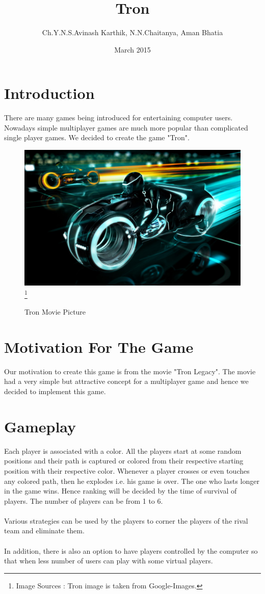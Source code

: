 \documentclass[14 pt]{article}
\title{\TitleFont Tron}
\author{Ch.Y.N.S.Avinash Karthik, N.N.Chaitanya, Aman Bhatia}
\date{March 2015}
\begin{document}
\maketitle

\section{Introduction}
There are many games being introduced for entertaining computer users. Nowadays simple multiplayer games are much more popular than complicated single player games. We decided to create the game "Tron".\\

\begin{figure}[h!]
\centering
\includegraphics[width =100 mm]{2.jpg}
\footnote{Image Sources : Tron image is taken from Google-Images.}\\
\caption{Tron Movie Picture}
\end{figure}

\section{Motivation For The Game}
    Our motivation to create this game is from the movie "Tron Legacy". The movie had a very simple but attractive concept for a multiplayer game and hence we decided to implement this game.\\

\section{Gameplay}
    Each player is associated with a color. All the players start at some random positions and their path is captured or colored from their respective starting position with their respective color. Whenever a player crosses or even touches any colored path, then he explodes i.e. his game is over. The one who lasts longer in the game wins. Hence ranking will be decided by the time of survival of players. The number of players can be from 1 to 6.\\\\
    Various strategies can be used by the players to corner the players of the rival team and eliminate them.\\\\
    In addition, there is also an option to have players controlled by the computer so that when less number of users can play with some virtual players.\\
\end{document}
